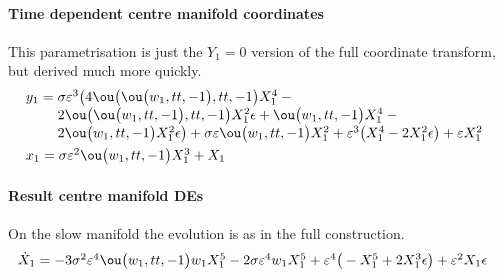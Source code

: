 \paragraph{Time dependent centre manifold coordinates}
This parametrisation is just the \(Y_1=0\) version of the full coordinate transform, but derived much more quickly.
\begin{align*}&
y_{1}=\ParMath{\sigma  \eps^{3} \big(4 \ou\big(\ou\big(w_{1},tt,-1\big),tt,-1
\big) X_{1}^{4}-2 \ou\big(\ou\big(w_{1},tt,-1\big),tt,-1\big) X_{1}^{2} 
\epsilon +\ou\big(w_{1},tt,-1\big) X_{1}^{4}-2 \ou\big(w_{1},tt,-1\big) 
X_{1}^{2} \epsilon \big)+\sigma  \eps \ou\big(w_{1},tt,-1\big) X_{1}^{2}
+\eps^{3} \big(X_{1}^{4}-2 X_{1}^{2} \epsilon \big)+\eps X_{1}^{2}
}
\\&
x_{1}=\ParMath{\sigma  \eps^{2} \ou\big(w_{1},tt,-1\big) X_{1}^{3}+X_{1}
}
\end{align*}

\paragraph{Result centre manifold DEs}
On the slow manifold the evolution is as in the full construction.
\begin{align*}&
\dot X_{1}=\ParMath{-3 \sigma ^{2} \eps^{4} \ou\big(w_{1},tt,-1\big) w_{1} X_{1}
^{5}-2 \sigma  \eps^{4} w_{1} X_{1}^{5}+\eps^{4} \big(-X_{1}^{5}+2 X_{1}
^{3} \epsilon \big)+\eps^{2} X_{1} \epsilon 
}
\end{align*}

